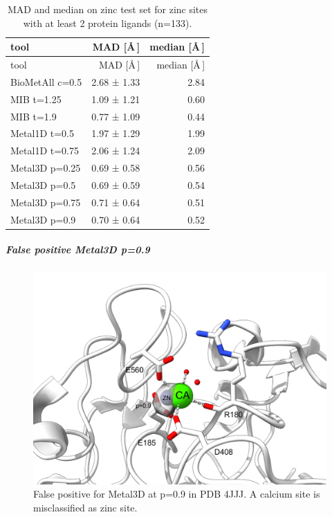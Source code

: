 \documentclass[  ASAPversion,
  ,
  9pt]{elife}
\newenvironment{fignos:tagged-figure}[1][]{
  \let\oldthefigure\thefigure
  \let\oldtheHfigure\theHfigure
  \renewcommand{\thefigure}{#1}
  \renewcommand{\theHfigure}{#1}
}{
  \let\thefigure\oldthefigure
  \let\theHfigure\oldtheHfigure
  \addtocounter{figure}{-1}
}
\newenvironment{tablenos:tagged-table}[1][]{
  \let\oldthetable\thetable
  \let\oldtheHtable\theHtable
  \renewcommand{\thetable}{#1}
  \renewcommand{\theHtable}{#1}
}{
  \let\thetable\oldthetable
  \let\theHtable\oldtheHtable
  \addtocounter{table}{-1}
}
\begin{document}
\begin{tablenos:tagged-table}[S4]

\begin{longtable}[]{@{}lrr@{}}
\caption{MAD and median on zinc test set for zinc sites with at least 2 protein ligands (n=133). \label{tbl:compmadmediantestgoodonly}}\tabularnewline
\toprule
tool & MAD {[}\AA\,{]} & median {[}\AA\,{]}\tabularnewline
\midrule
\endfirsthead
\toprule
tool & MAD {[}\AA\,{]} & median {[}\AA\,{]}\tabularnewline
\midrule
\endhead
BioMetAll c=0.5 & 2.68 ± 1.33 & 2.84\tabularnewline
MIB t=1.25 & 1.09 ± 1.21 & 0.60\tabularnewline
MIB t=1.9 & 0.77 ± 1.09 & 0.44\tabularnewline
Metal1D t=0.5 & 1.97 ± 1.29 & 1.99\tabularnewline
Metal1D t=0.75 & 2.06 ± 1.24 & 2.09\tabularnewline
Metal3D p=0.25 & 0.69 ± 0.58 & 0.56\tabularnewline
Metal3D p=0.5 & 0.69 ± 0.59 & 0.54\tabularnewline
Metal3D p=0.75 & 0.71 ± 0.64 & 0.51\tabularnewline
Metal3D p=0.9 & 0.70 ± 0.64 & 0.52\tabularnewline
\bottomrule
\end{longtable}

\end{tablenos:tagged-table}

\hypertarget{false-positive-metal3d-p0.9}{%
\subparagraph{False positive Metal3D p=0.9}\label{false-positive-metal3d-p0.9}}

\begin{fignos:tagged-figure}[S8]

\begin{figure}
\hypertarget{fig:4jjjFP}{%
\centering
\includegraphics{images/4JJJ_FalsePositive_p=0.9_annotated.png}
\caption{False positive for Metal3D at p=0.9 in PDB 4JJJ. A calcium site is misclassified as zinc site.}\label{fig:4jjjFP}
}
\end{figure}

\end{fignos:tagged-figure}
\end{document}
